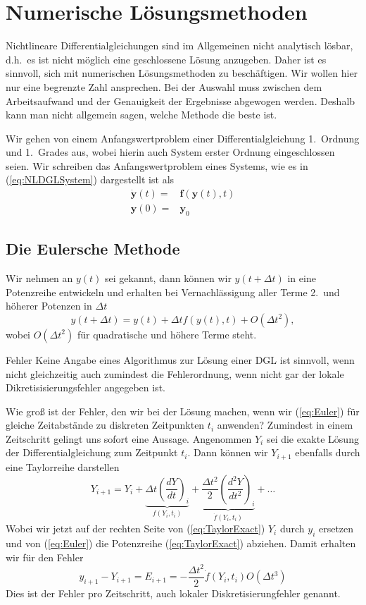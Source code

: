 \chapter{Numerische Lösungsmethoden}
Nichtlineare Differentialgleichungen sind im Allgemeinen nicht analytisch
lösbar, d.h.\ es ist nicht möglich eine geschlossene Lösung anzugeben. Daher
ist es sinnvoll, sich mit numerischen Lösungsmethoden zu beschäftigen.  Wir
wollen hier nur eine begrenzte Zahl ansprechen. Bei der Auswahl muss zwischen
dem Arbeitsaufwand und der Genauigkeit der Ergebnisse abgewogen werden. 
Deshalb kann man nicht allgemein sagen, welche Methode die beste ist. 


Wir gehen von einem Anfangswertproblem einer Differentialgleichung 1.\ Ordnung
und 1.\ Grades aus, wobei hierin auch System erster Ordnung eingeschlossen
seien. Wir schreiben das Anfangswertproblem eines Systems, wie es in
(\ref{eq:NLDGLSystem}) dargestellt ist als
\begin{align}
  \dot{\mathbf{y}}(t) =& \mathbf{f}(\mathbf{y}(t),t) \label{eq:yNLSystem}\\
  \mathbf{y}(0)       =& \mathbf{y}_{0}\nonumber
\end{align}
\section{Die Eulersche Methode}
Wir nehmen an $y(t)$ sei gekannt, dann können wir $y(t+\Delta t)$ in eine
Potenzreihe entwickeln und erhalten bei Vernachlässigung aller Terme 2.\ und
höherer Potenzen in $\Delta t$ 
\begin{equation}
  y(t+\Delta t) = y(t)+\Delta t f(y(t),t)+O(\Delta t^2),
  \label{eq:Euler}
\end{equation}
wobei $O(\Delta t^2)$ für quadratische und höhere Terme steht.

\begin{note}{Fehler}
  Keine Angabe eines Algorithmus zur Lösung einer DGL ist sinnvoll, wenn nicht
  gleichzeitig auch zumindest die Fehlerordnung, wenn nicht gar der lokale
  Dikretisisierungsfehler angegeben ist.
\end{note}
Wie groß ist der Fehler, den wir bei der Lösung machen, wenn wir
(\ref{eq:Euler}) für gleiche Zeitabstände zu diskreten Zeitpunkten
$t_i$ anwenden? Zumindest in einem Zeitschritt gelingt uns sofort eine Aussage.
Angenommen $Y_i$ sei die exakte Lösung der Differentialgleichung zum Zeitpunkt
$t_i$. Dann können wir $Y_{i+1}$ ebenfalls durch eine Taylorreihe darstellen
\begin{equation}
  Y_{i+1}=Y_{i}
  +\underbrace{\Delta t \left(\frac{dY}{dt}\right)_i}_{f(Y_i,t_i)}
  +\underbrace{\frac{\Delta t^2}{2}\left(\frac{d^2Y}{dt^2}\right)_i}_{\dot{f}(Y_i,t_i)}+\dots
  \label{eq:TaylorExact}
\end{equation}
Wobei wir jetzt auf der rechten Seite von (\ref{eq:TaylorExact}) $Y_i$ durch
$y_i$ ersetzen und von (\ref{eq:Euler}) die Potenzreihe (\ref{eq:TaylorExact})
abziehen. Damit erhalten wir für den Fehler
\begin{equation}
  y_{i+1}-Y_{i+1}=E_{i+1}=-\frac{\Delta t^2}{2}\dot{f}(Y_i,t_i)O(\Delta t^3)
  \label{eq:LokalerFehler}
\end{equation}
Dies ist der Fehler pro Zeitschritt, auch lokaler Diskretisierungfehler genannt.
